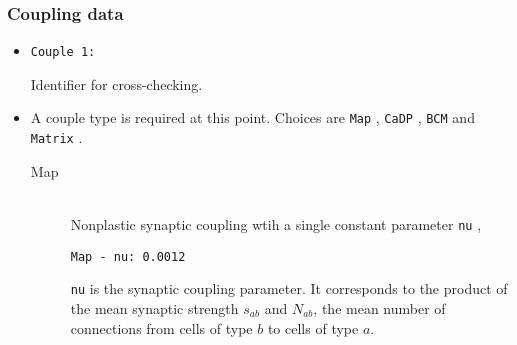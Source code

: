\documentclass[12pt,a4paper]{article}
\newcommand{\type}[1]{ {\small\small\tt #1} }
\begin{document}
\subsubsection{Coupling data}
\label{sec:couple}

\begin{itemize}

	\item
	\begin{lstlisting}
Couple 1:
	\end{lstlisting}
	Identifier for cross-checking.
\item A couple type is required at this point. Choices are \type{Map}, \type{CaDP}, \type{BCM} and \type{Matrix}.

\begin{description}

	\item[Map]\ \\
	Nonplastic synaptic coupling wtih a single constant parameter \type{nu},
	\begin{lstlisting}
Map - nu: 0.0012
	\end{lstlisting}
	\type{nu} is the synaptic coupling parameter. It corresponds to the product of the mean synaptic strength $s_{ab}$ and $N_{ab}$, the mean number of connections from cells of type $b$ to cells of type $a$.





\end{description}
\end{itemize}
\end{document}
